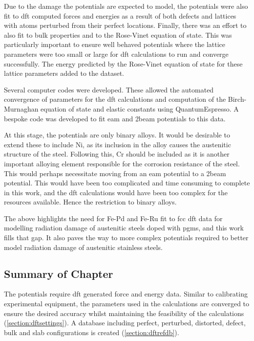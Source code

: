 Due to the damage the potentials are expected to model, the potentials were also fit to \acrshort{dft} computed forces and energies as a result of both defects and lattices with atoms perturbed from their perfect locations.  Finally, there was an effort to also fit to bulk properties and to the Rose-Vinet equation of state.  This was particularly important to ensure well behaved potentials where the lattice parameters were too small or large for \acrshort{dft} calculations to run and converge successfully.  The energy predicted by the Rose-Vinet equation of state for these lattice parameters added to the dataset.

Several computer codes were developed.  These allowed the automated convergence of parameters for the \acrshort{dft} calculations and computation of the Birch-Murnaghan equation of state and elastic constants using QuantumEspresso.  A bespoke code was developed to fit \acrshort{eam} and \acrshort{2beam} potentials to this data.

At this stage, the potentials are only binary alloys.  It would be desirable to extend these to include \Gls{Ni}, as its inclusion in the alloy causes the austenitic structure of the steel.  Following this, \Gls{Cr} should be included as it is another important alloying element responsible for the corrosion resistance of the steel.  This would perhaps necessitate moving from an \acrshort{eam} potential to a \acrshort{2beam} potential.  This would have been too complicated and time consuming to complete in this work, and the \acrshort{dft} calculations would have been too complex for the resources available.  Hence the restriction to binary alloys.

The above highlights the need for \Gls{Fe}-\Gls{Pd} and \Gls{Fe}-\Gls{Ru} fit to \acrshort{fcc} \acrshort{dft} data for modelling radiation damage of austenitic steels doped with \acrshort{pgm}s, and this work fills that gap.  It also paves the way to more complex potentials required to better model radiation damage of austenitic stainless steels.



\subsection{Summary of Chapter}

The potentials require \acrshort{dft} generated force and energy data.  Similar to calibrating experimental equipment, the parameters used in the calculations are converged to ensure the desired accuracy whilst maintaining the feasibility of the calculations (\ref{section:dftsettings}).  A database including perfect, perturbed, distorted, defect, bulk and slab configurations is created (\ref{section:dftrefdb}).

